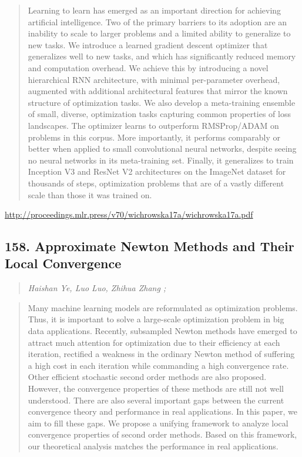 \documentclass{article}
\begin{document}
\begin{quote}
    Learning to learn has emerged as an important direction for achieving artificial intelligence. Two of the primary barriers to its adoption are an inability to scale to larger problems and a limited ability to generalize to new tasks. We introduce a learned gradient descent optimizer that generalizes well to new tasks, and which has significantly reduced memory and computation overhead. We achieve this by introducing a novel hierarchical RNN architecture, with minimal per-parameter overhead, augmented with additional architectural features that mirror the known structure of optimization tasks. We also develop a meta-training ensemble of small, diverse, optimization tasks capturing common properties of loss landscapes. The optimizer learns to outperform RMSProp/ADAM on problems in this corpus. More importantly, it performs comparably or better when applied to small convolutional neural networks, despite seeing no neural networks in its meta-training set. Finally, it generalizes to train Inception V3 and ResNet V2 architectures on the ImageNet dataset for thousands of steps, optimization problems that are of a vastly different scale than those it was trained on.  \end{quote}

\href{http://proceedings.mlr.press/v70/wichrowska17a/wichrowska17a.pdf}{http://proceedings.mlr.press/v70/wichrowska17a/wichrowska17a.pdf}

\subsection{158. Approximate Newton Methods and Their Local Convergence}

\begin{quote}
\footnotesize{\textit{Haishan Ye, Luo Luo, Zhihua Zhang ;}}
\end{quote}

\begin{quote}
    Many machine learning models are reformulated as optimization problems. Thus, it is important to solve a large-scale optimization problem in big data applications. Recently, subsampled Newton methods have emerged to attract much attention for optimization due to their efficiency at each iteration, rectified a weakness in the ordinary Newton method of suffering a high cost in each iteration while commanding a high convergence rate. Other efficient stochastic second order methods are also proposed. However, the convergence properties of these methods are still not well understood. There are also several important gaps between the current convergence theory and performance in real applications. In this paper, we aim to fill these gaps. We propose a unifying framework to analyze local convergence properties of second order methods. Based on this framework, our theoretical analysis matches the performance in real applications.  \end{quote}
\end{document}
